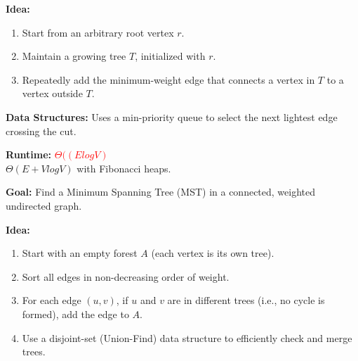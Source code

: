 \documentclass[a4paper,landscape]{article}
\newcommand{\timecomplexity}[1]{\textcolor{red}{#1}}
\begin{document}
\begin{multicols}{7}
\textbf{Idea:}
\begin{enumerate}[noitemsep, topsep=0pt]
    \item Start from an arbitrary root vertex $r$.
    \item Maintain a growing tree $T$, initialized with $r$.
    \item Repeatedly add the minimum-weight edge that connects a vertex in $T$ to a vertex outside $T$.
\end{enumerate}

\textbf{Data Structures:}
Uses a min-priority queue to select the next lightest edge crossing the cut.

\noindent %

\textbf{Runtime:} \timecomplexity{$\Theta((ElogV)$} \\ $\Theta(E+VlogV)$ with Fibonacci heaps.
\endtcolorbox

\tcolorbox[mybox={Kruskal’s Algorithm}]
\textbf{Goal:} Find a Minimum Spanning Tree (MST) in a connected, weighted undirected graph.

\textbf{Idea:}
\begin{enumerate}[noitemsep, topsep=0pt]
    \item Start with an empty forest $A$ (each vertex is its own tree).
    \item Sort all edges in non-decreasing order of weight.
    \item For each edge $(u, v)$, if $u$ and $v$ are in different trees (i.e., no cycle is formed), add the edge to $A$.
    \item Use a disjoint-set (Union-Find) data structure to efficiently check and merge trees.
\end{enumerate}


\end{multicols}
\end{document}
